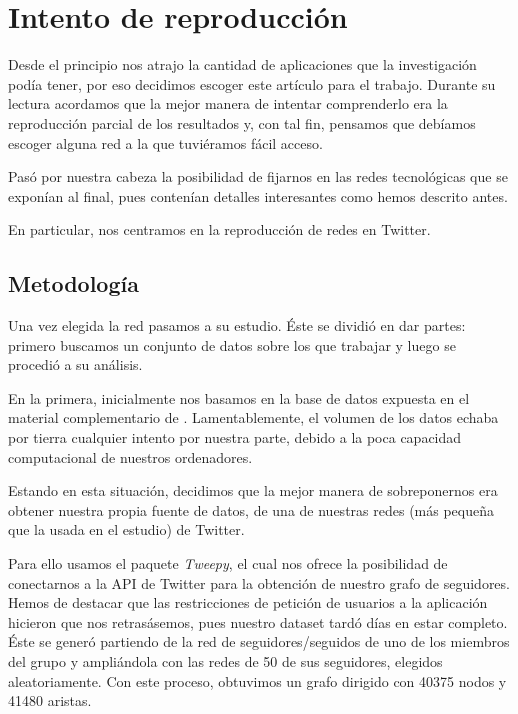 \documentclass[1p]{elsarticle}
\begin{document}
\section{Intento de reproducción}

Desde el principio nos atrajo la cantidad de aplicaciones que la investigación podía tener, por eso decidimos escoger este artículo para el trabajo. Durante su lectura acordamos que la mejor manera de intentar comprenderlo era la reproducción parcial de los resultados y, con tal fin, pensamos que debíamos escoger alguna red a la que tuviéramos fácil acceso.

Pasó por nuestra cabeza la posibilidad de fijarnos en las redes tecnológicas que se exponían al final, pues contenían detalles interesantes como hemos descrito antes.

En particular, nos centramos en la reproducción de redes en Twitter. 

\subsection{Metodología}
    Una vez elegida la red pasamos a su estudio.
    Éste se dividió en dar partes: primero buscamos un conjunto de datos sobre los que trabajar y luego se procedió a su análisis.
    
    En la primera, inicialmente nos basamos en la base de datos expuesta en el material complementario de \cite{arti}. 
    Lamentablemente, el volumen de los datos echaba por tierra cualquier intento por nuestra parte, debido a la poca capacidad computacional de nuestros ordenadores.

Estando en esta situación, decidimos que la mejor manera de sobreponernos era obtener nuestra propia fuente de datos, de una de nuestras redes (más pequeña que la usada en el estudio) de Twitter.

    Para ello usamos el paquete \textit{Tweepy}, el cual nos ofrece la posibilidad de conectarnos a la API de Twitter para la obtención de nuestro grafo de seguidores.
    Hemos de destacar que las restricciones de petición de usuarios a la aplicación hicieron que nos retrasásemos, pues nuestro dataset tardó días en estar completo.
    Éste se generó partiendo de la red de seguidores/seguidos de uno de los miembros del grupo y ampliándola con las redes de 50 de sus seguidores, elegidos aleatoriamente.
    Con este proceso, obtuvimos un grafo dirigido con 40375 nodos y 41480 aristas.
\end{document}
